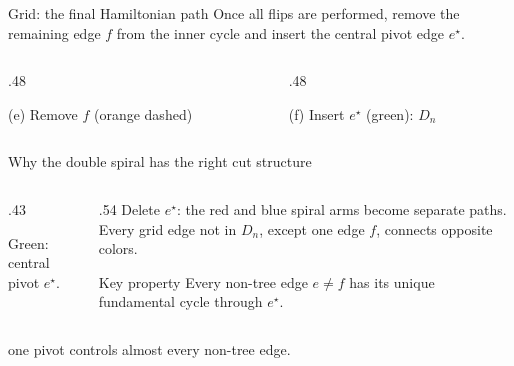 \begin{frame}{Grid: the final Hamiltonian path}
 Once all flips are performed, remove the remaining edge \(f\) from the inner cycle and insert the central pivot edge \(e^\star\).
 \begin{columns}[T,onlytextwidth]
  \begin{column}{.48\textwidth}
   \centering\resizebox{.70\linewidth}{!}{\SpiralFigE}
   \par\vspace{.08cm}\small (e) Remove \(f\) (orange dashed)
  \end{column}
  \begin{column}{.48\textwidth}
   \centering\resizebox{.70\linewidth}{!}{\SpiralFigF}
   \par\vspace{.08cm}\small (f) Insert \(e^\star\) (green): \(D_n\)
  \end{column}
 \end{columns}
\end{frame}


\begin{frame}{Why the double spiral has the right cut structure}
 \begin{columns}[c,onlytextwidth]
  \begin{column}{.43\textwidth}
   \centering\resizebox{.91\linewidth}{!}{\SpiralFigF}
   \par\small Green: central pivot $e^\star$.
  \end{column}
  \begin{column}{.54\textwidth}
    Delete $e^\star$: the red and blue spiral arms become separate paths.
   \vspace{.14cm}
   Every grid edge not in $D_n$, except one edge $f$, connects opposite colors.
   \vspace{.14cm}
   \begin{block}{Key property}
   Every non-tree edge $e\ne f$ has its unique fundamental cycle through $e^\star$.
   \end{block}
  \end{column}
 \end{columns}
 \vspace{.07cm}
 \small{} one pivot controls almost every non-tree edge.
\end{frame}


